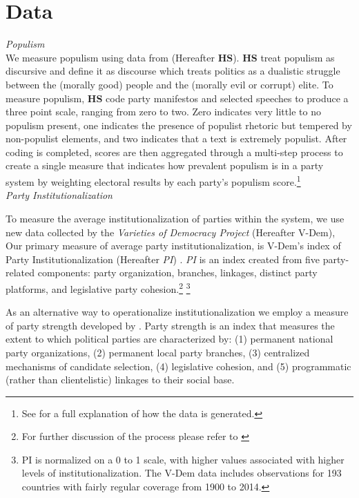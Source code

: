 \documentclass[a4paper,12pt]{article}\usepackage[]{graphicx}\usepackage[]{color}
\begin{document}
\section*{Data}
\noindent
\textit{Populism}\\
We measure populism using data from \citet{hawkins2015mapping} (Hereafter \textbf{HS}). \textbf{HS} treat populism as discursive and define it as discourse which treats politics as a dualistic struggle between the (morally good) people and the (morally evil or corrupt) elite. To measure populism, \textbf{HS} code party manifestos and selected speeches to produce a three point scale, ranging from zero to two. Zero indicates very little to no populism present, one indicates the presence of populist rhetoric but tempered by non-populist elements, and two indicates that a text is extremely populist. After coding is completed, scores are then aggregated through a multi-step process to create a single measure that indicates how prevalent populism is in a party system by weighting electoral results by each party's populism score.\footnote{See \citet{hawkins2015mapping} for a full explanation of how the data is generated.}  
\\
\noindent
\textit{Party Institutionalization} 
\par
To measure the average institutionalization of parties within the system, we use new data collected by the \textit{Varieties of Democracy Project} (Hereafter V-Dem), Our primary measure of average party institutionalization, is V-Dem’s index of Party Institutionalization (Hereafter \textit{PI}) \citep{bizzarro2018party}. \textit{PI} is an index created from five party-related components: party organization, branches, linkages, distinct party platforms, and legislative party cohesion.\footnote{For further discussion of the process please refer to \citet{bizzarro2017v} } \footnote{{PI} is normalized on a 0 to 1 scale, with higher values associated with higher levels of institutionalization. The V-Dem data includes observations for 193 countries with fairly regular coverage from 1900 to 2014.}
\par
As an alternative way to operationalize institutionalization we employ a measure of party strength developed by \citet{bizzarro2017v}. Party strength is an index that measures the extent to which political parties are characterized by: (1) permanent national party organizations, (2) permanent local party branches, (3) centralized mechanisms of candidate selection, (4) legislative cohesion, and (5) programmatic (rather than clientelistic) linkages to their social base. %
\end{document}

